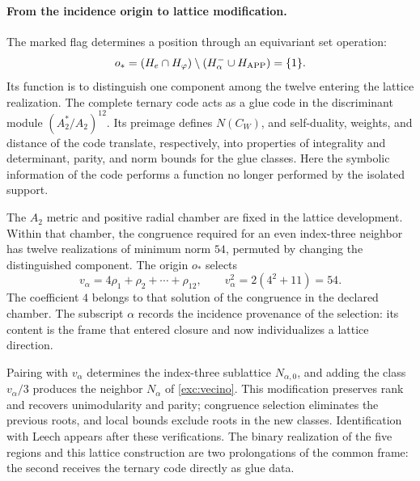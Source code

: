 \paragraph{From the incidence origin to lattice modification.}
\label{inc-ampl-reticulo}
The marked flag determines a position through an equivariant
set operation:
\[
 o_*=(H_e\cap H_\varphi)
       \setminus(H^-_\alpha\cup H_{\rm APP})=\{1\}.
\]
Its function is to distinguish one component among the twelve entering
the lattice realization. The complete ternary code
acts as a glue code in the discriminant module
$(A_2^*/A_2)^{12}$. Its preimage defines $N(C_W)$, and
self-duality, weights, and distance of the code translate,
respectively, into properties of integrality and determinant, parity,
and norm bounds for the glue classes. Here the symbolic information
of the code performs a function no longer performed by the isolated support.

The $A_2$ metric and positive radial chamber are fixed in the lattice
development. Within that chamber, the congruence required for an even
index-three neighbor has twelve realizations of minimum norm $54$,
permuted by changing the distinguished component. The origin $o_*$
selects
\[
 v_\alpha=4\rho_1+\rho_2+\cdots+\rho_{12},\qquad
 v_\alpha^2=2(4^2+11)=54.
\]
The coefficient $4$ belongs to that solution of the congruence in the
declared chamber. The subscript $\alpha$ records the incidence
provenance of the selection: its content is the frame that entered
closure and now individualizes a lattice direction.

Pairing with $v_\alpha$ determines the index-three sublattice
$N_{\alpha,0}$, and adding the class
$v_\alpha/3$ produces the neighbor $N_\alpha$ of
\eqref{exc:vecino}. This modification preserves rank and recovers
unimodularity and parity; congruence selection eliminates the previous
roots, and local bounds exclude roots in the new classes.
Identification with Leech appears after these verifications. The
binary realization of the five regions and this lattice construction
are two prolongations of the common frame: the second receives the
ternary code directly as glue data.

